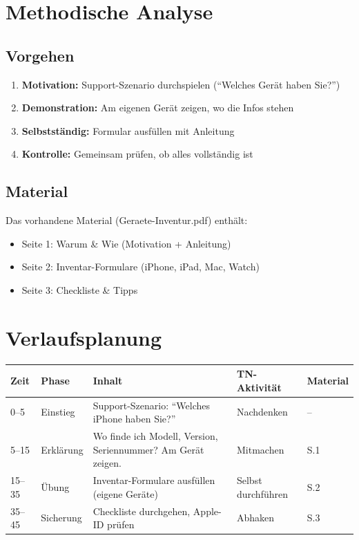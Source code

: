 \documentclass[11pt,a4paper]{article}
\begin{document}
\section{Methodische Analyse}

\subsection{Vorgehen}
\begin{enumerate}
    \item \textbf{Motivation:} Support-Szenario durchspielen (``Welches Gerät haben Sie?'')
    \item \textbf{Demonstration:} Am eigenen Gerät zeigen, wo die Infos stehen
    \item \textbf{Selbstständig:} Formular ausfüllen mit Anleitung
    \item \textbf{Kontrolle:} Gemeinsam prüfen, ob alles vollständig ist
\end{enumerate}

\subsection{Material}
Das vorhandene Material (Geraete-Inventur.pdf) enthält:
\begin{itemize}
    \item Seite 1: Warum \& Wie (Motivation + Anleitung)
    \item Seite 2: Inventar-Formulare (iPhone, iPad, Mac, Watch)
    \item Seite 3: Checkliste \& Tipps
\end{itemize}

\section{Verlaufsplanung}

\begin{longtable}{|p{1cm}|p{2cm}|p{5cm}|p{3cm}|p{2cm}|}
\hline
\textbf{Zeit} & \textbf{Phase} & \textbf{Inhalt} & \textbf{TN-Aktivität} & \textbf{Material} \\
\hline
0--5 & Einstieg & Support-Szenario: ``Welches iPhone haben Sie?'' & Nachdenken & -- \\
\hline
5--15 & Erklärung & Wo finde ich Modell, Version, Seriennummer? Am Gerät zeigen. & Mitmachen & S.1 \\
\hline
15--35 & Übung & Inventar-Formulare ausfüllen (eigene Geräte) & Selbst durchführen & S.2 \\
\hline
35--45 & Sicherung & Checkliste durchgehen, Apple-ID prüfen & Abhaken & S.3 \\
\hline
\end{longtable}
\end{document}

